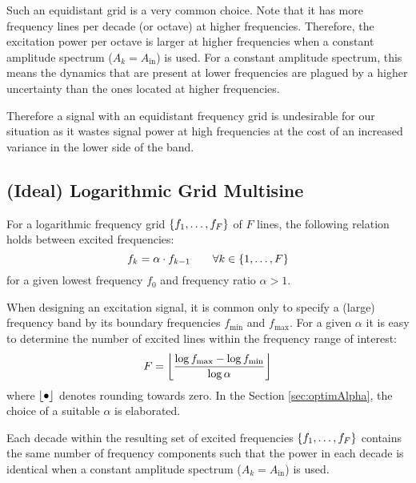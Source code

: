   Such an equidistant grid is a very common choice.
  Note that it has more frequency lines per decade (or octave) at higher frequencies.
  Therefore, the excitation power per octave is larger at higher frequencies
  when a constant amplitude spectrum ($A_k = A_{\mathrm{in}}$) is used.
  For a constant amplitude spectrum, this means the dynamics that are present at lower frequencies are plagued by a higher uncertainty than the ones located at higher frequencies.
  
  Therefore a signal with an equidistant frequency grid is undesirable for
  our situation as it wastes signal power at high frequencies at the cost of an increased variance in the lower side of the band.
  
\subsection{(Ideal) Logarithmic Grid Multisine}
  For a logarithmic frequency grid $\left\{f_1, \ldots, f_F\right\}$ of $F$ lines,
  the following relation holds between excited frequencies:
  \begin{equation}
    f_k = \alpha \cdot f_{k-1}
    \qquad \forall k \in \left\{1,\ldots,F\right\}
  \label{eq:logGrid}
  \end{equation}
  for a given lowest frequency $f_0$ and frequency ratio $\alpha > 1$.

  When designing an excitation signal, it is common only to specify a (large) frequency band
  by its boundary frequencies $f_{\min}$ and $f_{\max}$.
  For a given $\alpha$ it is easy to determine the number of excited lines
  within the frequency range of interest:
    \begin{equation}
      F = \left\lfloor 
                  \frac{\log{f_{\max}} - \log{f_{\min}}}
                       {\log{\alpha}}
                 \right\rfloor
    \end{equation}
  where $\left\lfloor \bullet \right\rfloor$ denotes rounding towards zero.
  In the Section \ref{sec:optimAlpha}, the choice of a suitable $\alpha$ is elaborated.


  Each decade within the resulting set of excited frequencies $\left\{f_1, \ldots, f_F\right\}$ contains the same number of frequency components such that the power in each decade is identical when a constant amplitude spectrum ($A_k = A_{\mathrm{in}}$) is used.


